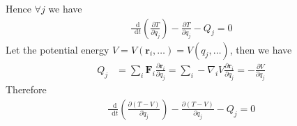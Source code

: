 \documentclass[twoside,11pt]{article}
\renewcommand*\d{\mathop{}\!\mathrm{d}}
\theoremstyle{definition}
\theoremstyle{remark}
\begin{document}
Hence $\forall j$ we have
\begin{align}
    \frac{\d }{\d t}\left(\frac{\partial T}{\partial\dot{q}_j}\right)
    - \frac{\partial T}{\partial q_j}
    - Q_j = 0
    \label{lag0}
\end{align}
Let the potential energy $V=V(\mathbf{r}_i,\dots)=V(q_j,\dots)$,
then we have
\begin{align}
    Q_j &= \sum_i\mathbf{F}_i\frac{\partial\mathbf{r}_i}{\partial q_j}
    = \sum_i -\nabla_i V\frac{\partial\mathbf{r}_i}{\partial q_j}
    = -\frac{\partial V}{\partial q_j}
\end{align}
Therefore
\begin{align}
    \frac{\d }{\d t}\left(\frac{\partial (T-V)}{\partial\dot{q}_j}\right)
    - \frac{\partial (T-V)}{\partial q_j}
    - Q_j = 0
\end{align}



\end{document}
